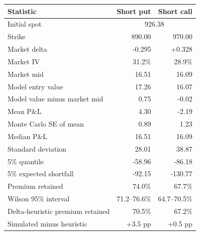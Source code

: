 \begin{tabular}{lrr}\toprule
Statistic & Short put & Short call \\\midrule
Initial spot & \multicolumn{2}{c}{926.38} \\
Strike & 890.00 & 970.00 \\
Market delta & -0.295 & +0.328 \\
Market IV & 31.2\% & 28.9\% \\
Market mid & 16.51 & 16.09 \\
Model entry value & 17.26 & 16.07 \\
Model value minus market mid & 0.75 & -0.02 \\
Mean P\&L & 4.30 & -2.19 \\
Monte Carlo SE of mean & 0.89 & 1.23 \\
Median P\&L & 16.51 & 16.09 \\
Standard deviation & 28.01 & 38.87 \\
5\% quantile & -58.96 & -86.18 \\
5\% expected shortfall & -92.15 & -130.77 \\
Premium retained & 74.0\% & 67.7\% \\
Wilson 95\% interval & 71.2--76.6\% & 64.7--70.5\% \\
Delta-heuristic premium retained & 70.5\% & 67.2\% \\
Simulated minus heuristic & +3.5 pp & +0.5 pp \\
\bottomrule\end{tabular}

